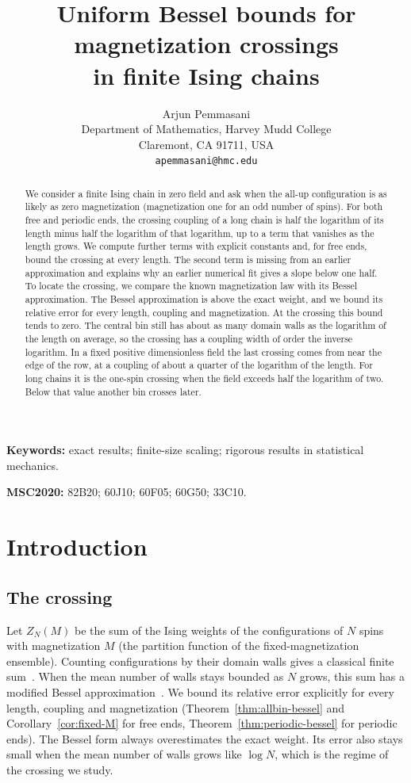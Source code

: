 \documentclass[11pt]{article}
\title{Uniform Bessel bounds for magnetization crossings\\ in finite Ising chains}
\author{Arjun Pemmasani\\[2pt]
\small Department of Mathematics, Harvey Mudd College\\
\small Claremont, CA 91711, USA\\
\small \texttt{apemmasani@hmc.edu}}
\date{}
\theoremstyle{definition}
\theoremstyle{remark}
\begin{document}
\maketitle

\begin{abstract}
We consider a finite Ising chain in zero field and ask when the all-up
configuration is as likely as zero magnetization (magnetization one for
an odd number of spins). For both free and periodic ends, the crossing
coupling of a long chain is half the logarithm of its length minus half
the logarithm of that logarithm, up to a term that vanishes as the
length grows. We compute further terms with explicit constants and, for
free ends, bound the crossing at every length. The second term is
missing from an earlier approximation and explains why an earlier numerical
fit gives a slope below one half. To locate the crossing, we compare the
known magnetization law with its Bessel approximation. The Bessel
approximation is above the exact weight, and we bound its relative error
for every length, coupling and magnetization. At the crossing this bound
tends to zero. The central bin still has about as many domain walls as
the logarithm of the length on average, so the crossing has a coupling
width of order the inverse logarithm. In a fixed positive dimensionless
field the last crossing comes from near the edge of the row, at a
coupling of about a quarter of the logarithm of the length. For long
chains it is the one-spin crossing when the field exceeds half the
logarithm of two. Below that value another bin crosses later.
\end{abstract}

\noindent\textbf{Keywords:} exact results; finite-size scaling; rigorous results in statistical mechanics.

\noindent\textbf{MSC2020:} 82B20; 60J10; 60F05; 60G50; 33C10.

\section{Introduction}\label{sec:intro}

\subsection{The crossing}

Let $Z_N(M)$ be the sum of the Ising weights of the configurations of $N$
spins with magnetization $M$ (the partition function of the fixed-magnetization
ensemble). Counting configurations by their domain walls gives a
classical finite sum~\cite{ising1925,antal2004,garciapelayo2009,dantchev2022}. When the
mean number of walls stays bounded as $N$ grows, this sum has a modified
Bessel approximation~\cite{antal2004,dantchev2023,dantchev2024}. We bound
its relative error explicitly for every length, coupling and
magnetization (Theorem~\ref{thm:allbin-bessel} and
Corollary~\ref{cor:fixed-M} for free ends, Theorem~\ref{thm:periodic-bessel} for periodic
ends). The Bessel form always overestimates the
exact weight. Its error also stays small when the mean number of walls
grows like $\log N$, which is the regime of the crossing we study.
\end{document}
